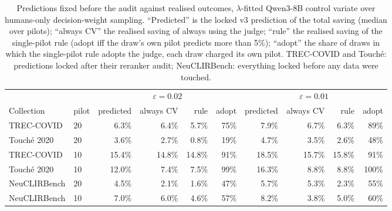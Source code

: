 \documentclass{article}
\newcommand{\eps}{\varepsilon}
\begin{document}
\begin{table}[t]\centering\footnotesize\setlength{\tabcolsep}{4pt}
\caption{Predictions fixed before the audit against realised outcomes, $\lambda$-fitted Qwen3-8B control variate over humans-only decision-weight sampling. ``Predicted'' is the locked v3 prediction of the total saving (median over pilots); ``always CV'' the realised saving of always using the judge; ``rule'' the realised saving of the single-pilot rule (adopt iff the draw's own pilot predicts more than 5\%); ``adopt'' the share of draws in which the single-pilot rule adopts the judge, each draw charged its own pilot. TREC-COVID and Touch\'e: predictions locked after their reranker audit; NeuCLIRBench: everything locked before any data were touched.}\label{tab:heldout}
\begin{tabular}{llrrrr rrrr}\toprule
 & & \multicolumn{4}{c}{$\eps=0.02$} & \multicolumn{4}{c}{$\eps=0.01$}\\
Collection & pilot & predicted & always CV & rule & adopt & predicted & always CV & rule & adopt\\\midrule
TREC-COVID & 20 & 6.3\% & 6.4\% & 5.7\% & 75\% & 7.9\% & 6.7\% & 6.3\% & 89\%\\
Touch\'e 2020 & 20 & 3.6\% & 2.7\% & 0.8\% & 19\% & 4.7\% & 3.5\% & 2.6\% & 48\%\\
TREC-COVID & 10 & 15.4\% & 14.8\% & 14.8\% & 91\% & 18.5\% & 15.7\% & 15.8\% & 91\%\\
Touch\'e 2020 & 10 & 12.0\% & 7.4\% & 7.5\% & 99\% & 16.3\% & 8.8\% & 8.8\% & 100\%\\\midrule
NeuCLIRBench & 20 & 4.5\% & 2.1\% & 1.6\% & 47\% & 5.7\% & 5.3\% & 2.3\% & 55\%\\
NeuCLIRBench & 10 & 7.0\% & 6.0\% & 4.6\% & 57\% & 8.2\% & 3.8\% & 5.0\% & 60\%\\\bottomrule
\end{tabular}
\end{table}
\end{document}
